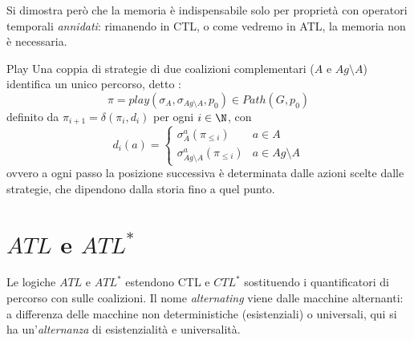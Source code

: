 Si dimostra però che la memoria è indispensabile solo per proprietà con operatori temporali \emph{annidati}: rimanendo in CTL, o come vedremo in ATL, la memoria non è necessaria.

\begin{definition}{Play}
  Una coppia di strategie di due coalizioni complementari (\(A\) e \(Ag\setminus A\)) identifica un unico percorso, detto :
  \[\pi = play(\sigma_A,\sigma_{Ag\setminus A}, p_0) \in Path(G,p_0)\]
  definito da \(\pi_{i+1} = \delta(\pi_i, d_i)\) per ogni \(i \in \N\), con
  \[d_i(a) = \begin{cases}
      \sigma_A^a(\pi_{\leq i})            & a \in A            \\
      \sigma_{Ag\setminus A}^a(\pi_{\leq i}) & a \in Ag\setminus A
    \end{cases}\]
  ovvero a ogni passo la posizione successiva è determinata dalle azioni scelte dalle strategie, che dipendono dalla storia fino a quel punto.
\end{definition}

\section{\texorpdfstring{\(ATL\)}{ATL} e \texorpdfstring{\(ATL^*\)}{ATL*}}

Le logiche \(ATL\) e \(ATL^*\) estendono CTL e \(CTL^*\) sostituendo i quantificatori di percorso con  sulle coalizioni. Il nome \textit{alternating} viene dalle macchine alternanti: a differenza delle macchine non deterministiche (esistenziali) o universali, qui si ha un'\emph{alternanza} di esistenzialità e universalità.

